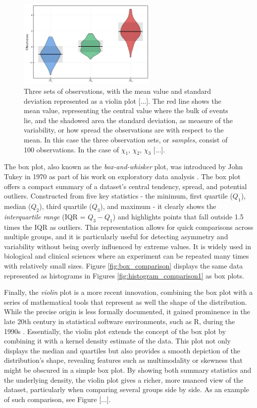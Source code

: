 \documentclass{book}
\begin{document}
\begin{figure}[ht]
    \centering
    \includegraphics[width=0.6\textwidth]{figures/chapter1/mean_std_violin.png}
    \caption{Three sets of observations, with the mean value and standard deviation represented as a violin plot [...]. The red line shows the mean value, representing the central value where the bulk of events lie, and the shadowed area the standard deviation, as measure of the variability, or how spread the observations are with respect to the mean. In this case the three observation sets, or \textit{samples}, consist of 100 observations. In the case of $\chi_1$, $\chi_2$, $\chi_3$ [...].}
    \label{fig:histogram1}
\end{figure}

The box plot, also known as the \textit{box-and-whisker} plot, was introduced by John Tukey in 1970 as part of his work on exploratory data analysis \cite{tukey1977}. The box plot offers a compact summary of a dataset’s central tendency, spread, and potential outliers. Constructed from five key statistics - the minimum, first quartile ($Q_1$), median ($Q_2$), third quartile ($Q_3$), and maximum - it clearly shows the \textit{interquartile range} (IQR = $Q_3 - Q_1$) and highlights points that fall outside 1.5 times the IQR as outliers. This representation allows for quick comparisons across multiple groups, and it is particularly useful for detecting asymmetry and variability without being overly influenced by extreme values. It is widely used in biological and clinical sciences where an experiment can be repeated many times with relatively small sizes. Figure \ref{fig:box_comparison} displays the same data represented as histograms in Figures \ref{fig:histogram_comparison1} as box plots.

\medskip

Finally, the \textit{violin} plot is a more recent innovation, combining the box plot with a series of mathematical tools that represent as well the shape of the distribution. While the precise origin is less formally documented, it gained prominence in the late 20th century in statistical software environments, such as R, during the 1990s \cite{hintze1997}. Essentially, the violin plot extends the concept of the box plot by combining it with a kernel density estimate of the data. This plot not only displays the median and quartiles but also provides a smooth depiction of the distribution’s shape, revealing features such as multimodality or skewness that might be obscured in a simple box plot. By showing both summary statistics and the underlying density, the violin plot gives a richer, more nuanced view of the dataset, particularly when comparing several groups side by side. As an example of such comparison, see Figure [...].
\end{document}
